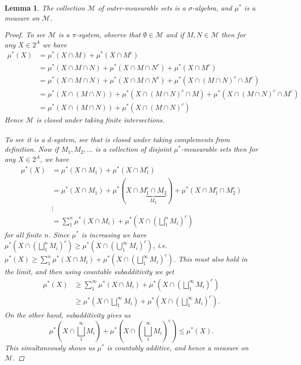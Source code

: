 \documentclass[9pt]{report}
\newlength{\tindent}
\newtheorem[L]{theorem}{Theorem}[chapter]
\newtheorem{lemma}[theorem]{Lemma}
\newtheorem[L,nocut]{definition}[theorem]{Definition}
\newtheorem[S,nounderline]{remark}[theorem]{Remarks}
\newenvironment{Proof}{ 
	\\ \setlength{\parindent}{\tindent}
\begin{proof}}
{\end{proof} \setlength{\parindent}{0pt}}
\begin{document}
\begin{lemma}
	The collection \(\mathcal{M}\) of outer-measurable sets is a \(\sigma\)-algebra, and \(\mu^*\) is a measure on \(\mathcal{M}\).
	\begin{Proof}
		To see \(\mathcal{M}\) is a \(\pi\)-system, observe that \(\emptyset\in \mathcal{M}\) and if \(M,N\in \mathcal{M}\) then for any \(X \in 2^A\) we have 
		\begin{align*}
			\mu^*(X) &= \mu^*(X \cap M) + \mu^*(X \cap M^c) \\ 
				 &= \mu^*(X\cap M \cap N) + \mu^*(X \cap M \cap N^c) + \mu^*(X \cap M^c )\\
				 &= \mu^*(X\cap M \cap N) + \mu^*(X \cap M \cap N^c) + \mu^*(X \cap (M \cap N)^c \cap M^c )\\
				 &= \mu^*(X\cap (M \cap N)) + \mu^* (X \cap (M\cap N)^c \cap M) + \mu^*(X \cap (M \cap N)^c \cap M^c) \\ 
				 &= \mu^*(X\cap (M\cap N)) + \mu^* (X\cap (M\cap N)^c)
		\end{align*}
		Hence \(\mathcal{M}\) is closed under taking finite intersections. \\ \\ 
		To see it is a \(d\)-system, see that is closed under taking complements from definition. Now if \(M_1, M_2, ...\) is a collection of disjoint \(\mu^*\)-measurable sets then for any \(X\in 2^A\), we have 
		\begin{align*}
			\mu^*(X)&=\mu^*(X \cap M_1) + \mu^* (X \cap M_1^c) \\ 
				&= \mu^*(X\cap M_1) + \mu^* (X\cap \underbrace{M_1^c \cap M_2}_{M_2}) + \mu^* \left(X \cap M_1 ^c \cap M_2^c\right) \\ 
				&\vdots \\
				&= \sum_1^n \mu^*\left(X\cap M_i\right) + \mu^* \left(X \cap \left(\bigsqcup_1^n M_i\right)^c\right)
		\end{align*}
		for all finite \(n\). Since \(\mu^*\) is increasing we have  \(\mu^*(X\cap (\bigsqcup_1^nM_i)^c)\geq \mu^*(X\cap (\bigcup_1^\infty M_i)^c)\), i.e. \(\mu^*(X)\geq \sum_1^n \mu^*(X\cap M_i) + \mu^* (X\cap (\bigsqcup_1^\infty M_i)^c)\). This must also hold in the limit, and then using countable subadditivity we get 
		\begin{align*}
			\mu^*(X)&\geq \sum_1^\infty \mu^*(X\cap M_i) + \mu^*\left(X\cap \left(\bigsqcup_1^\infty M_i\right)^c\right) \\ 
				&\geq \mu^*\left(X\cap \bigsqcup_1^\infty M_i\right) + \mu^*\left(X\cap \left(\bigsqcup_1^\infty M_i\right)^c\right).
		\end{align*}
		On the other hand, subadditivity gives us 
		\[\mu^*\left(X\cap \bigsqcup_1^\infty M_i\right) + \mu^*\left(X \cap \left(\bigsqcup_1^\infty M_i\right)^c\right) \leq \mu^*(X).\] 
		This simultaneously shows us \(\mu^*\) is countably additive, and hence a measure on \(\mathcal{M}\). 
	\end{Proof}
\end{lemma}
\end{document}
